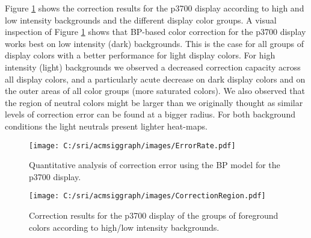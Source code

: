 \documentclass[annual]{acmsiggraph}
\begin{document}
Figure \ref{fig:Figure12} shows the correction results for the p3700 display according to high and low intensity backgrounds and the different display color groups. A visual inspection of Figure \ref{fig:Figure12} shows that BP-based color correction for the p3700 display works best on low intensity (dark) backgrounds. This is the case for all groups of display colors with a better performance for light display colors. For high intensity (light) backgrounds we observed a decreased correction capacity across all display colors, and a particularly acute decrease on dark display colors and on the outer areas of all color groups (more saturated colors). We also observed that the region of neutral colors might be larger than we originally thought as similar levels of correction error can be found at a bigger radius. For both background conditions the light neutrals present lighter heat-maps.
\begin{figure}[ht]
  \centering
  \texttt{[image: C:/sri/acmsiggraph/images/ErrorRate.pdf]}
  \caption{Quantitative analysis of correction error using the BP model for the p3700 display.}
    \label{fig:Figure12}
 \end{figure}
\begin{figure*}[ht]
  \centering
  \texttt{[image: C:/sri/acmsiggraph/images/CorrectionRegion.pdf]}
  \caption{Correction results for the p3700 display of the groups of foreground colors according to high/low intensity backgrounds.}
  \label{fig:Figure13}
\end{figure*}
\end{document}
